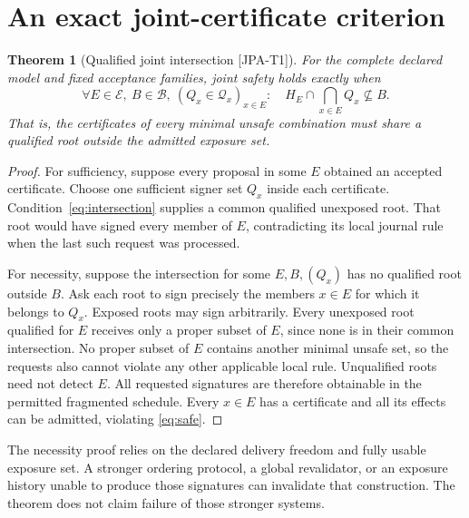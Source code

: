 \documentclass[11pt,a4paper]{article}
\newtheorem{theorem}{Theorem}\newtheorem{proposition}[theorem]{Proposition}\newtheorem{corollary}[theorem]{Corollary}
\theoremstyle{definition}\newtheorem{definition}{Definition}
\newcommand{\idtag}[1]{\textnormal{\textsf{[#1]}}}
\newcommand{\E}{\mathcal E}\newcommand{\B}{\mathcal B}\newcommand{\F}{\mathcal F}\newcommand{\Q}{\mathcal Q}
\begin{document}
\section{An exact joint-certificate criterion}
\label{sec:theory}
\begin{theorem}[Qualified joint intersection \idtag{JPA-T1}]
\label{thm:intersection}
For the complete declared model and fixed acceptance families, joint safety holds exactly when
\begin{equation}
\boxed{\forall E\in\E,\ B\in\B,\ (Q_x\in\Q_x)_{x\in E}:\quad
H_E\cap\bigcap_{x\in E}Q_x\not\subseteq B.}
\label{eq:intersection}
\end{equation}
That is, the certificates of every minimal unsafe combination must share a qualified root outside the admitted exposure set.
\end{theorem}
\begin{proof}
For sufficiency, suppose every proposal in some $E$ obtained an accepted certificate. Choose one sufficient signer set $Q_x$ inside each certificate. Condition~\eqref{eq:intersection} supplies a common qualified unexposed root. That root would have signed every member of $E$, contradicting its local journal rule when the last such request was processed.

For necessity, suppose the intersection for some $E,B,(Q_x)$ has no qualified root outside $B$. Ask each root to sign precisely the members $x\in E$ for which it belongs to $Q_x$. Exposed roots may sign arbitrarily. Every unexposed root qualified for $E$ receives only a proper subset of $E$, since none is in their common intersection. No proper subset of $E$ contains another minimal unsafe set, so the requests also cannot violate any other applicable local rule. Unqualified roots need not detect $E$. All requested signatures are therefore obtainable in the permitted fragmented schedule. Every $x\in E$ has a certificate and all its effects can be admitted, violating \cref{eq:safe}.
\end{proof}
The necessity proof relies on the declared delivery freedom and fully usable exposure set. A stronger ordering protocol, a global revalidator, or an exposure history unable to produce those signatures can invalidate that construction. The theorem does not claim failure of those stronger systems.
\end{document}
